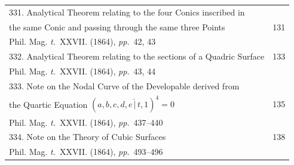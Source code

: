 \documentclass[11pt,a4paper]{article}
\newcommand{\tome}{\textit{t.}}
\newcommand{\pages}{\textit{pp.}}
\begin{document}
\begin{longtable}{p{4.5in}r}
\multicolumn{2}{l}{331. Analytical Theorem relating to the four Conics inscribed in} \\[-0.3em]
\quad the same Conic and passing through the same three Points & 131 \\[-0.3em]
\multicolumn{2}{l}{\quad\small Phil. Mag. \tome~XXVII. (1864), \pages~42, 43} \\[0.5em]

332. Analytical Theorem relating to the sections of a Quadric Surface & 133 \\[-0.3em]
\multicolumn{2}{l}{\quad\small Phil. Mag. \tome~XXVII. (1864), \pages~43, 44} \\[0.5em]

\multicolumn{2}{l}{333. Note on the Nodal Curve of the Developable derived from} \\[-0.3em]
\quad the Quartic Equation $(a, b, c, d, e\,\check{\!|\,}t, 1)^4 = 0$ & 135 \\[-0.3em]
\multicolumn{2}{l}{\quad\small Phil. Mag. \tome~XXVII. (1864), \pages~437--440} \\[0.5em]

334. Note on the Theory of Cubic Surfaces & 138 \\[-0.3em]
\multicolumn{2}{l}{\quad\small Phil. Mag. \tome~XXVII. (1864), \pages~493--496} \\[0.5em]
\end{longtable}

\clearpage
\end{document}
